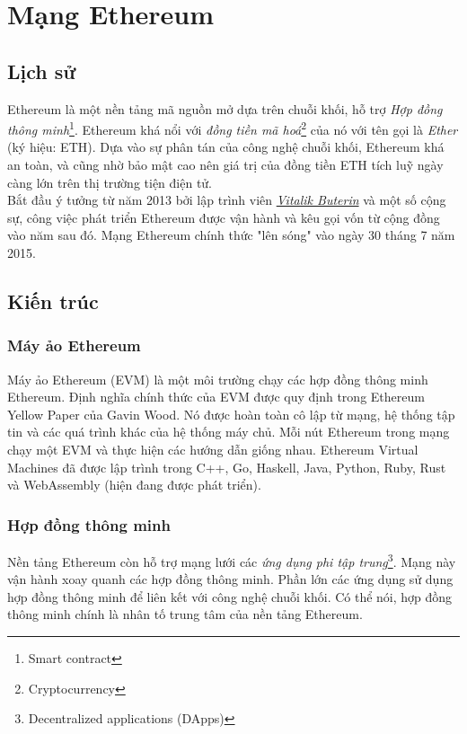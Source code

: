 \section{Mạng Ethereum}

\subsection{Lịch sử}

Ethereum là một nền tảng mã nguồn mở dựa trên chuỗi khối, hỗ trợ \textit{Hợp đồng thông minh}\footnote{Smart contract}. Ethereum khá nổi với \textit{đồng tiền mã hoá}\footnote{Cryptocurrency} của nó với tên gọi là \textit{Ether} (ký hiệu: ETH). Dựa vào sự phân tán của công nghệ chuỗi khối, Ethereum khá an toàn, và cũng nhờ bảo mật cao nên giá trị của đồng tiền ETH tích luỹ ngày càng lớn trên thị trường tiện điện tử.\\

Bắt đầu ý tưởng từ năm 2013 bởi lập trình viên \href{https://en.wikipedia.org/wiki/Vitalik_Buterin}{\textit{Vitalik Buterin}} và một số cộng sự, công việc phát triển Ethereum được vận hành và kêu gọi vốn từ cộng đồng vào năm sau đó. Mạng Ethereum chính thức "lên sóng" vào ngày 30 tháng 7 năm 2015.

\subsection{Kiến trúc}

\subsubsection*{Máy ảo Ethereum}

Máy ảo Ethereum (EVM) là một môi trường chạy các hợp đồng thông minh Ethereum. Định nghĩa chính thức của EVM được quy định trong Ethereum Yellow Paper của Gavin Wood. Nó được hoàn toàn cô lập từ mạng, hệ thống tập tin và các quá trình khác của hệ thống máy chủ. Mỗi nút Ethereum trong mạng chạy một EVM và thực hiện các hướng dẫn giống nhau. Ethereum Virtual Machines đã được lập trình trong C++, Go, Haskell, Java, Python, Ruby, Rust và WebAssembly (hiện đang được phát triển).

\subsubsection*{Hợp đồng thông minh}

Nền tảng Ethereum còn hỗ trợ mạng lưới các \textit{ứng dụng phi tập trung}\footnote{Decentralized applications (DApps)}. Mạng này vận hành xoay quanh các hợp đồng thông minh. Phần lớn các ứng dụng sử dụng hợp đồng thông minh để liên kết với công nghệ chuỗi khối. Có thể nói, hợp đồng thông minh chính là nhân tố trung tâm của nền tảng Ethereum.\\


